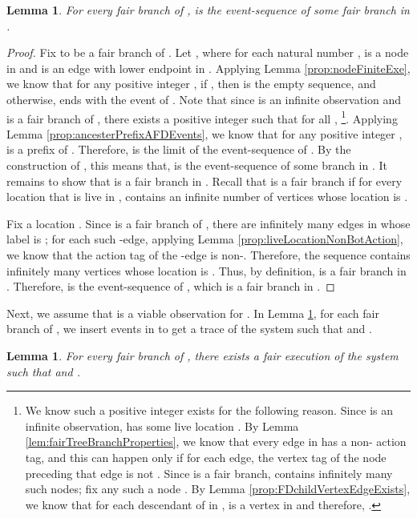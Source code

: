 \documentclass[11pt]{article}
\numberwithin{theorem}{section}
\newtheorem{lemma}[theorem]{Lemma}
\begin{document}
\begin{lemma}
\label{lem:fairBranchEventSequence}
For every fair branch  of ,  is the
event-sequence of some fair branch in .
\end{lemma}
\begin{proof}
Fix  to  be a fair branch of .
Let , where for each natural number ,  is a node in  and  is an edge with lower endpoint  in .
Applying Lemma \ref{prop:nodeFiniteExe}, we know that
for any positive integer , if , then  is the empty sequence, and otherwise,  ends with the event of 
. Note that since  is an infinite observation and  is a fair branch of , there exists a positive integer  such that for all , \footnote{
We know such a positive integer  exists for the following reason. Since  is an infinite observation,  has some live location . By Lemma \ref{lem:fairTreeBranchProperties}, we know that every  edge in  has a non- action tag, and this can happen only if for each  edge, the vertex tag of the node preceding that edge is not . Since  is a fair branch,  contains infinitely many such nodes; fix any such a node . By Lemma \ref{prop:FDchildVertexEdgeExists}, we know that for each descendant  of  in ,  is a vertex in  and therefore, .}.
Applying Lemma \ref{prop:ancesterPrefixAFDEvents}, we
know that for any positive integer ,  is a prefix of
. Therefore,  is the limit of the event-sequence of 
. By the construction of , this means that,  is the
event-sequence of some branch  in . It
remains to show that  is a fair branch in . 
Recall that  is a fair branch if for every location  that is live in ,  contains an infinite number of vertices whose location is .

Fix a location . Since  is a fair branch of , there are infinitely many edges in  whose
label is ; for each such -edge, applying Lemma
\ref{prop:liveLocationNonBotAction}, we know that the action tag of
the -edge is non-. Therefore, the sequence  contains infinitely many
vertices whose location is . Thus, by definition,  is a fair branch
in . Therefore,  is the event-sequence of , which is a fair
branch in .
\end{proof}


Next, we assume that  is a viable observation for . 
In Lemma \ref{lem:fairExe}, for each fair branch  of , we insert  events in  to get a trace  of the system  such that  and .

\begin{lemma}
\label{lem:fairExe}
For every fair branch  of , there exists a fair
execution   of the system  such that  and .
\end{lemma}
\end{document}
